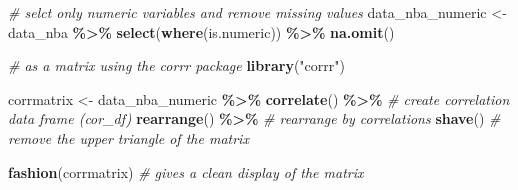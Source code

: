 \documentclass[
]{book}
\newenvironment{Shaded}{\begin{snugshade}}{\end{snugshade}}
\newcommand{\CommentTok}[1]{\textcolor[rgb]{0.56,0.35,0.01}{\textit{#1}}}
\newcommand{\FunctionTok}[1]{\textcolor[rgb]{0.13,0.29,0.53}{\textbf{#1}}}
\newcommand{\NormalTok}[1]{#1}
\newcommand{\OtherTok}[1]{\textcolor[rgb]{0.56,0.35,0.01}{#1}}
\newcommand{\SpecialCharTok}[1]{\textcolor[rgb]{0.81,0.36,0.00}{\textbf{#1}}}
\newcommand{\StringTok}[1]{\textcolor[rgb]{0.31,0.60,0.02}{#1}}
\begin{document}
\begin{Shaded}
\begin{Highlighting}[]
\CommentTok{\# selct only numeric variables and remove missing values}
\NormalTok{data\_nba\_numeric }\OtherTok{\textless{}{-}}\NormalTok{ data\_nba }\SpecialCharTok{\%\textgreater{}\%}
  \FunctionTok{select}\NormalTok{(}\FunctionTok{where}\NormalTok{(is.numeric)) }\SpecialCharTok{\%\textgreater{}\%}
  \FunctionTok{na.omit}\NormalTok{()}

\CommentTok{\# as a matrix using the corrr package}
\FunctionTok{library}\NormalTok{(}\StringTok{"corrr"}\NormalTok{)}

\NormalTok{corrmatrix }\OtherTok{\textless{}{-}}\NormalTok{ data\_nba\_numeric }\SpecialCharTok{\%\textgreater{}\%}
  \FunctionTok{correlate}\NormalTok{() }\SpecialCharTok{\%\textgreater{}\%} \CommentTok{\# create correlation data frame (cor\_df)}
  \FunctionTok{rearrange}\NormalTok{() }\SpecialCharTok{\%\textgreater{}\%} \CommentTok{\# rearrange by correlations}
  \FunctionTok{shave}\NormalTok{() }\CommentTok{\# remove the upper triangle of the matrix}

\FunctionTok{fashion}\NormalTok{(corrmatrix) }\CommentTok{\# gives a clean display of the matrix}
\end{Highlighting}
\end{Shaded}
\end{document}
